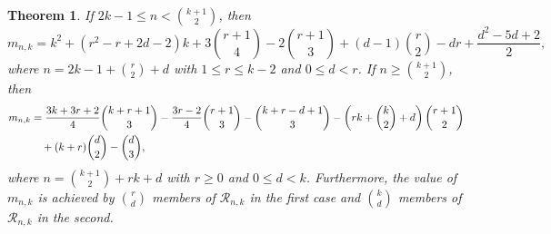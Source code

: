 \documentclass[11pt,a4paper]{article}
\newtheorem{theorem}{Theorem}[section]
\begin{document}
\begin{theorem}\label{maxinvrnk}
If $2k-1 \leq n <\binom{k+1}{2}$, then
\begin{equation}\label{maxinvrnke1}
m_{n,k}=k^2+(r^2-r+2d-2)k+3\binom{r+1}{4}-2\binom{r+1}{3}+(d-1)\binom{r}{2}-dr+\frac{d^2-5d+2}{2},
\end{equation}
where $n=2k-1+\binom{r}{2}+d$ with $1 \leq r \leq k-2$ and $0 \leq d <r$. If $n \geq \binom{k+1}{2}$, then
\begin{align}
m_{n,k}&=\frac{3k+3r+2}{4}\binom{k+r+1}{3}-\frac{3r-2}{4}\binom{r+1}{3}-\binom{k+r-d+1}{3}-\left(rk+\binom{k}{2}+d\right)\binom{r+1}{2}\notag\\
&\quad+(k+r)\binom{d}{2}-\binom{d}{3}, \label{maxinvrnke2}
\end{align}
where $n=\binom{k+1}{2}+rk+d$ with $r \geq 0$ and $0 \leq d <k$.  Furthermore, the value of $m_{n,k}$ is achieved by $\binom{r}{d}$ members of $\mathcal{R}_{n,k}$ in the first case and $\binom{k}{d}$ members of $\mathcal{R}_{n,k}$ in the second.
\end{theorem}
\end{document}
